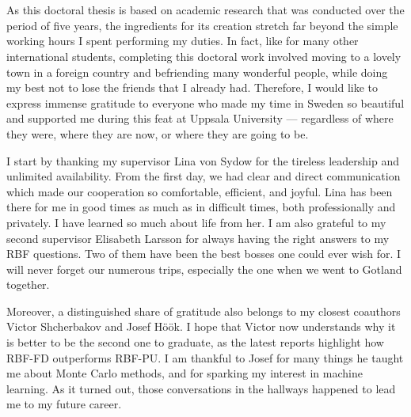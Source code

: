 \documentclass{UUThesisTemplate}
\begin{document}
\chapter{{}}
{\noteunic
\par
As this doctoral thesis is based on academic research that was conducted over the period of five years, the ingredients for its creation stretch far beyond the simple working hours I spent performing my duties. In fact, like for many other international students, completing this doctoral work involved moving to a lovely town in a foreign country and befriending many wonderful people, while doing my best not to lose the friends that I already had. Therefore, I would like to express immense gratitude to everyone who made my time in Sweden so beautiful and supported me during this feat at Uppsala University --- regardless of where they were, where they are now, or where they are going to be.

\par
I start by thanking my supervisor Lina von Sydow for the tireless leadership and unlimited availability. From the first day, we had clear and direct communication which made our cooperation so comfortable, efficient, and joyful. Lina has been there for me in good times as much as in difficult times, both professionally and privately. I have learned so much about life from her. I am also grateful to my second supervisor Elisabeth Larsson for always having the right answers to my RBF questions. Two of them have been the best bosses one could ever wish for. I will never forget our numerous trips, especially the one when we went to Gotland together.

\par
Moreover, a distinguished share of gratitude also belongs to my closest coauthors Victor Shcherbakov and Josef Höök. I hope that Victor now understands why it is better to be the second one to graduate, as the latest reports highlight how RBF-FD outperforms RBF-PU. I am thankful to Josef for many things he taught me about Monte Carlo methods, and for sparking my interest in machine learning. As it turned out, those conversations in the hallways happened to lead me to my future career. 

}
\end{document}
